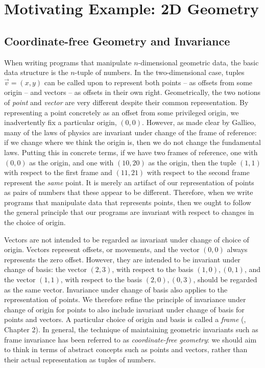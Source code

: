\section{Motivating Example: 2D Geometry}

\subsection{Coordinate-free Geometry and Invariance}

When writing programs that manipulate $n$-dimensional geometric data,
the basic data structure is the $n$-tuple of numbers. In the
two-dimensional case, tuples $\vec{v} = (x,y)$ can be called upon to
represent both points -- as offsets from some origin -- and vectors --
as offsets in their own right. Geometrically, the two notions of
\emph{point} and \emph{vector} are very different despite their common
representation. By representing a point concretely as an offset from
some privileged origin, we inadvertently fix a particular origin,
$(0,0)$. However, as made clear by Gallieo, many of the laws of
physics are invariant under change of the frame of reference: if we
change where we think the origin is, then we do not change the
fundamental laws. Putting this in concrete terms, if we have two
frames of reference, one with $(0,0)$ as the origin, and one with
$(10,20)$ as the origin, then the tuple $(1,1)$ with respect to the
first frame and $(11,21)$ with respect to the second frame represent
the \emph{same} point. It is merely an artifact of our representation
of points as pairs of numbers that these appear to be
different. Therefore, when we write programs that manipulate data that
represents points, then we ought to follow the general principle that
our programs are invariant with respect to changes in the choice of
origin.

Vectors are not intended to be regarded as invariant under change of
choice of origin. Vectors represent offsets, or movements, and the
vector $(0,0)$ always represents the zero offset. However, they are
intended to be invariant under change of basis: the vector $(2,3)$,
with respect to the basis $(1,0),(0,1)$, and the vector $(1,1)$, with
respect to the basis $(2,0),(0,3)$, should be regarded as the same
vector. Invariance under change of basis also applies to the
representation of points. We therefore refine the principle of
invariance under change of origin for points to also include invariant
under change of basis for points and vectors. A particular choice of
origin and basis is called a \emph{frame} (\cite{gallier11geometric},
Chapter 2). In general, the technique of maintaining geometric
invariants such as frame invariance has been referred to as
\emph{coordinate-free geometry}: we should aim to think in terms of
abstract concepts such as points and vectors, rather than their actual
representation as tuples of numbers.

